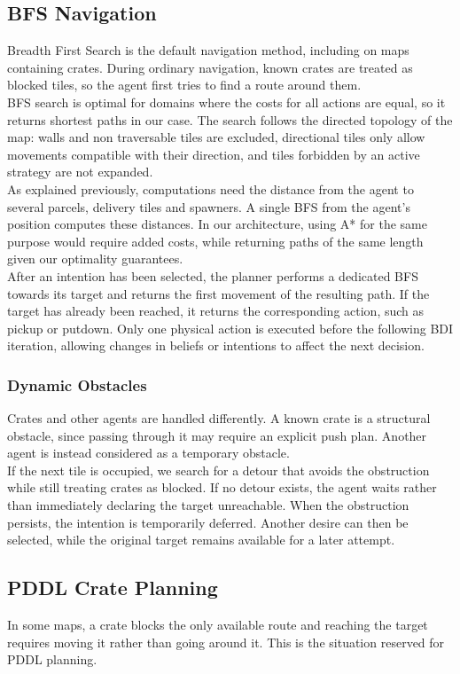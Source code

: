 \documentclass[11pt,a4paper]{article}
\begin{document}
\subsection{BFS Navigation}
Breadth First Search is the default navigation method, including on maps containing crates.
During ordinary navigation, known crates are treated as blocked tiles, so the agent first tries to find a route around them.
\\BFS search is optimal for domains where the costs for all actions are equal, so it returns shortest paths in our case.
The search follows the directed topology of the map: walls and non traversable tiles are excluded, directional tiles
only allow movements compatible with their direction, and tiles forbidden by an active strategy are not expanded.
\\As explained previously, computations need the distance from the agent to several parcels, delivery tiles and spawners. 
A single BFS from the agent's position computes these distances. 
In our architecture, using A* for the same purpose would require added costs, while returning paths of the same length given our optimality guarantees.
\\After an intention has been selected, the planner performs a dedicated BFS towards its target and returns the first movement of the resulting path.
If the target has already been reached, it returns the corresponding action, such as pickup or putdown. 
Only one physical action is executed before the following BDI iteration, allowing changes in beliefs or intentions to affect the next decision.

\subsubsection{Dynamic Obstacles}
Crates and other agents are handled differently. 
A known crate is a structural obstacle, since passing through it may require an explicit push plan. 
Another agent is instead considered as a temporary obstacle.
\\If the next tile is occupied, we search for a detour that avoids the obstruction while still treating crates as blocked.
If no detour exists, the agent waits rather than immediately declaring the target unreachable.
When the obstruction persists, the intention is temporarily deferred. 
Another desire can then be selected, while the original target remains available for a later attempt.

\subsection{PDDL Crate Planning}
In some maps, a crate blocks the only available route and reaching the target requires moving it
rather than going around it. This is the situation reserved for PDDL planning.
\end{document}
